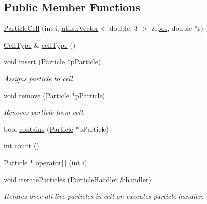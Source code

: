 \subsection*{Public Member Functions}
\begin{DoxyCompactItemize}
\item 
\hyperlink{classSimulation_1_1ParticleCell_a2a61d645388b8c75d17d3d7c63640674}{Particle\-Cell} (int i, \hyperlink{classutils_1_1Vector}{utils\-::\-Vector}$<$ double, 3 $>$ \&\hyperlink{classSimulation_1_1ParticleCell_a4bb88bb8f5196cf9ad558f304fe33404}{pos}, double $\ast$r)
\item 
\hyperlink{classSimulation_1_1ParticleCell_a2212779392dcf6befecc55da1ec5356c}{Cell\-Type} \& \hyperlink{classSimulation_1_1ParticleCell_a17d535f80c15a7abcab53d5230bbc524}{cell\-Type} ()
\item 
void \hyperlink{classSimulation_1_1ParticleCell_a780c301fa5e209ac14e36cc642e6450b}{insert} (\hyperlink{classSimulation_1_1Particle}{Particle} $\ast$p\-Particle)
\begin{DoxyCompactList}\small\item\em Assigns particle to cell. \end{DoxyCompactList}\item 
void \hyperlink{classSimulation_1_1ParticleCell_a5904e658b003356347c0f91e5293a0fb}{remove} (\hyperlink{classSimulation_1_1Particle}{Particle} $\ast$p\-Particle)
\begin{DoxyCompactList}\small\item\em Renoves particle from cell. \end{DoxyCompactList}\item 
bool \hyperlink{classSimulation_1_1ParticleCell_a6bda33452ea101d0ef4e06097286a7b3}{contains} (\hyperlink{classSimulation_1_1Particle}{Particle} $\ast$p\-Particle)
\item 
int \hyperlink{classSimulation_1_1ParticleCell_a8bb8b7e8ec24efb5a8fa89c0888e9367}{count} ()
\item 
\hyperlink{classSimulation_1_1Particle}{Particle} $\ast$ \hyperlink{classSimulation_1_1ParticleCell_a947d53f31f29826e948f0461c2795341}{operator\mbox{[}$\,$\mbox{]}} (int i)
\item 
void \hyperlink{classSimulation_1_1ParticleCell_aeaf10920eb0a8065635e31e27630fd5d}{iterate\-Particles} (\hyperlink{classSimulation_1_1ParticleHandler}{Particle\-Handler} \&handler)
\begin{DoxyCompactList}\small\item\em Iterates over all live particles in cell an executes particle handler. \end{DoxyCompactList}\item 

\end{DoxyCompactItemize}
